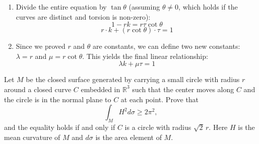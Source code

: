 \begin{solution}
\begin{enumerate}
    \item Divide the entire equation by $\tan \theta$ (assuming $\theta \neq 0$, which holds if the curves are distinct and torsion is non-zero):
       \[ 1 - rk = r\tau \cot \theta \]
       \[ r \cdot k + (r \cot \theta) \cdot \tau = 1 \]

    \item Since we proved $r$ and $\theta$ are constants, we can define two new constants: $\lambda = r$ and $\mu = r \cot \theta$. This yields the final linear relationship:
       \[ \lambda k + \mu \tau = 1 \]
\end{enumerate}
\end{solution}

\begin{exercise}
\label{geometry:2011:6}
Let $M$ be the closed surface generated by carrying a small circle with radius $r$ around a closed curve $C$ embedded in $\mathbb{R}^{3}$ such that the center moves along $C$ and the circle is in the normal plane to $C$ at each point. Prove that
\[ \int_{M} H^{2} d\sigma \geq 2\pi^{2}, \]
and the equality holds if and only if $C$ is a circle with radius $\sqrt{2}\,r$. Here $H$ is the mean curvature of $M$ and $d\sigma$ is the area element of $M$.
\end{exercise}

